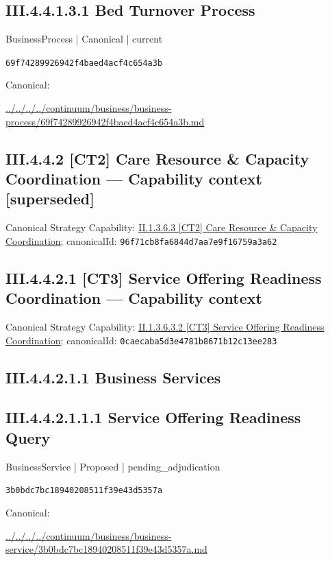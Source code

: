 \documentclass[10pt,a4paper]{article}
\begin{document}
\subsection*{III.4.4.1.3.1 Bed Turnover Process}
\label{element-69f74289926942f4baed4acf4c654a3b}
{\small BusinessProcess | Canonical | current}\par
\texttt{69f74289926942f4baed4acf4c654a3b}\par
Canonical: \par
{\footnotesize\url{../../../../continuum/business/business-process/69f74289926942f4baed4acf4c654a3b.md}}\par
\subsection*{III.4.4.2 [CT2] Care Resource \& Capacity Coordination — Capability context [superseded]}
Canonical Strategy Capability: \hyperref[element-96f71cb8fa6844d7aa7e9f16759a3a62]{II.1.3.6.3 [CT2] Care Resource \& Capacity Coordination}; canonicalId: \texttt{96f71cb8fa6844d7aa7e9f16759a3a62}\par
\subsection*{III.4.4.2.1 [CT3] Service Offering Readiness Coordination — Capability context}
Canonical Strategy Capability: \hyperref[element-0caecaba5d3e4781b8671b12c13ee283]{II.1.3.6.3.2 [CT3] Service Offering Readiness Coordination}; canonicalId: \texttt{0caecaba5d3e4781b8671b12c13ee283}\par
\subsection*{III.4.4.2.1.1 Business Services}
\subsection*{III.4.4.2.1.1.1 Service Offering Readiness Query}
\label{element-3b0bdc7bc18940208511f39e43d5357a}
{\small BusinessService | Proposed | pending\_adjudication}\par
\texttt{3b0bdc7bc18940208511f39e43d5357a}\par
Canonical: \par
{\footnotesize\url{../../../../continuum/business/business-service/3b0bdc7bc18940208511f39e43d5357a.md}}\par
\end{document}
